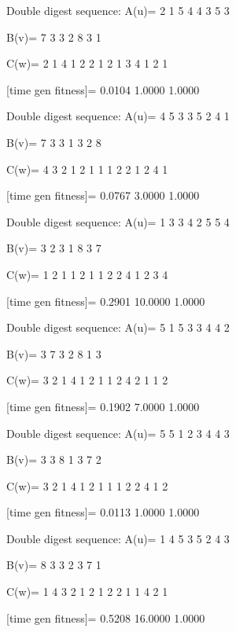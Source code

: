 Double digest sequence:
A(u)=
     2     1     5     4     4     3     5     3

B(v)=
     7     3     3     2     8     3     1

C(w)=
     2     1     4     1     2     2     1     2     1     3     4     1     2     1

[time gen fitness]=
    0.0104    1.0000    1.0000

Double digest sequence:
A(u)=
     4     5     3     3     5     2     4     1

B(v)=
     7     3     3     1     3     2     8

C(w)=
     4     3     2     1     2     1     1     1     2     2     1     2     4     1

[time gen fitness]=
    0.0767    3.0000    1.0000

Double digest sequence:
A(u)=
     1     3     3     4     2     5     5     4

B(v)=
     3     2     3     1     8     3     7

C(w)=
     1     2     1     1     2     1     1     2     2     4     1     2     3     4

[time gen fitness]=
    0.2901   10.0000    1.0000

Double digest sequence:
A(u)=
     5     1     5     3     3     4     4     2

B(v)=
     3     7     3     2     8     1     3

C(w)=
     3     2     1     4     1     2     1     1     2     4     2     1     1     2

[time gen fitness]=
    0.1902    7.0000    1.0000

Double digest sequence:
A(u)=
     5     5     1     2     3     4     4     3

B(v)=
     3     3     8     1     3     7     2

C(w)=
     3     2     1     4     1     2     1     1     1     2     2     4     1     2

[time gen fitness]=
    0.0113    1.0000    1.0000

Double digest sequence:
A(u)=
     1     4     5     3     5     2     4     3

B(v)=
     8     3     3     2     3     7     1

C(w)=
     1     4     3     2     1     2     1     2     2     1     1     4     2     1

[time gen fitness]=
    0.5208   16.0000    1.0000

